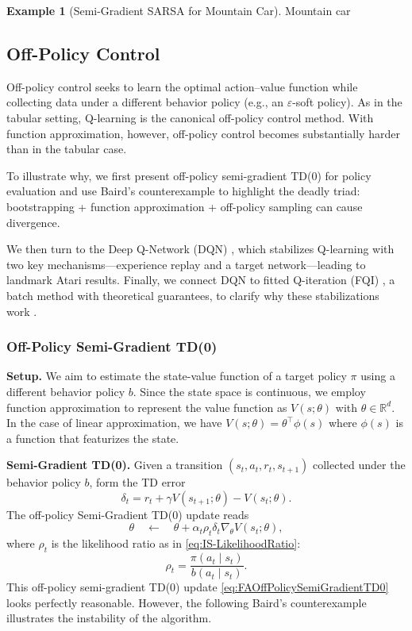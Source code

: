 \documentclass[
]{book}
\theoremstyle{definition}
\theoremstyle{definition}
\newtheorem{example}{Example}[chapter]
\theoremstyle{definition}
\theoremstyle{definition}
\theoremstyle{remark}
\begin{document}
\begin{example}[Semi-Gradient SARSA for Mountain Car]
\protect\hypertarget{exm:MountainCarSemiGradientSARSA}{}\label{exm:MountainCarSemiGradientSARSA}Mountain car
\end{example}

\subsection{Off-Policy Control}\label{off-policy-control-1}

Off-policy control seeks to learn the optimal action--value function while collecting data under a different behavior policy (e.g., an \(\varepsilon\)-soft policy). As in the tabular setting, Q-learning is the canonical off-policy control method. With function approximation, however, off-policy control becomes substantially harder than in the tabular case.

To illustrate why, we first present off-policy semi-gradient TD(0) for policy evaluation and use Baird's counterexample \citep{baird1995residual} to highlight the deadly triad: bootstrapping + function approximation + off-policy sampling can cause divergence.

We then turn to the Deep Q-Network (DQN) \citep{mnih2015human}, which stabilizes Q-learning with two key mechanisms---experience replay and a target network---leading to landmark Atari results. Finally, we connect DQN to fitted Q-iteration (FQI) \citep{riedmiller2005neural}, a batch method with theoretical guarantees, to clarify why these stabilizations work \citep{fan2020theoretical}.

\subsubsection{Off-Policy Semi-Gradient TD(0)}\label{off-policy-semi-gradient-td0}

\textbf{Setup.} We aim to estimate the state-value function of a target policy \(\pi\) using a different behavior policy \(b\). Since the state space is continuous, we employ function approximation to represent the value function as \(V(s;\theta)\) with \(\theta \in \mathbb{R}^d\). In the case of linear approximation, we have \(V(s;\theta) = \theta^\top \phi(s)\) where \(\phi(s)\) is a function that featurizes the state.

\textbf{Semi-Gradient TD(0).} Given a transition \((s_t,a_t,r_t,s_{t+1})\) collected under the behavior policy \(b\), form the TD error
\[
\delta_t = r_t + \gamma V(s_{t+1}; \theta) - V(s_t;\theta).
\]
The off-policy Semi-Gradient TD(0) update reads
\begin{equation}
\theta \quad \leftarrow \quad \theta + \alpha_t \rho_t \delta_t \nabla_\theta V(s_t; \theta),
\label{eq:FAOffPolicySemiGradientTD0}
\end{equation}
where \(\rho_t\) is the likelihood ratio as in \eqref{eq:IS-LikelihoodRatio}:
\[
\rho_t = \frac{\pi(a_t \mid s_t)}{b(a_t \mid s_t)}.
\]
This off-policy semi-gradient TD(0) update \eqref{eq:FAOffPolicySemiGradientTD0} looks perfectly reasonable. However, the following Baird's counterexample illustrates the instability of the algorithm.
\end{document}
